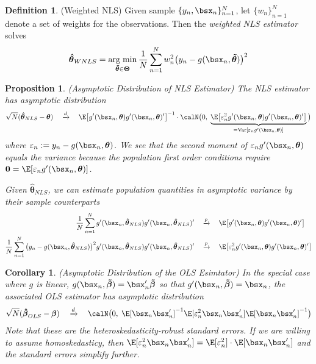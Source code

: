 \documentclass[12pt]{article}
\theoremstyle{plain}
\newtheorem{prop}[thm]{Proposition}
\newtheorem{cor}[thm]{Corollary}
\theoremstyle{definition}
\newtheorem{defn}[thm]{Definition}
\theoremstyle{remark}
\newcommand{\bstheta}{\boldsymbol{\theta}}
\newcommand{\bsTheta}{\boldsymbol{\Theta}}
\newcommand{\bsbeta}{\boldsymbol{\beta}}
\newcommand{\bshatbeta}{\boldsymbol{\hat{\beta}}}
\newcommand{\bshattheta}{\boldsymbol{\hat{\theta}}}
\newcommand{\bstildebeta}{\boldsymbol{\tilde{\beta}}}
\newcommand{\bstildetheta}{\boldsymbol{\tilde{\theta}}}
\renewcommand{\bso}{\boldsymbol{0}}
\DeclareMathOperator*{\argmin}{arg\;min}
\newcommand{\Var}{\operatorname{Var}}
\newcommand{\pto}{\xrightarrow{p}}
\newcommand{\dto}{\xrightarrow{d}}
\newcommand{\sumnN}{\sum^N_{n=1}}
\newcommand{\nN}{_{n=1}^N}
\begin{document}
\begin{defn}(Weighted NLS)
Given sample $\{y_n,\bsx_n\}\nN$, let $\{w_n\}\nN$ denote a set of
weights for the observations. Then the \emph{weighted NLS estimator}
solves
\begin{align}
  \bshattheta_{WNLS}
  = \argmin_{\bstildetheta\in\bsTheta}
  \frac{1}{N}\sumnN w_n^2\big(y_n-g(\bsx_n,\bstildetheta)\big)^2
  \label{wnls}
\end{align}
\end{defn}


\begin{prop}\emph{(Asymptotic Distribution of NLS Estimator)}
The NLS estimator has asymptotic distribution
\begin{align*}
  \sqrt{N}(\bshattheta_{NLS}-\bstheta)
  \quad\dto\quad
  \E\big[
  g'(\bsx_n,\bstheta)g'(\bsx_n,\bstheta)'
  \big]^{-1}
  \cdot
  \calN\big(0,\;
  \underbrace{%
  \E\big[\varepsilon_n^2g'(\bsx_n,\bstheta)g'(\bsx_n,\bstheta)'\big]
  }_{=\Var[\varepsilon_ng'(\bsx_n,\bstheta)]}
  \big)
\end{align*}
where $\varepsilon_n:=y_n-g(\bsx_n,\bstheta)$.  We see that the second
moment of $\varepsilon_n g'(\bsx_n,\bstheta)$ equals the variance
because the population first order conditions require
$\bso = \E[\varepsilon_n g'(\bsx_n,\bstheta)]$.

Given $\bshattheta_{NLS}$, we can estimate population quantities in
asymptotic variance by their sample counterparts
\begin{align*}
  \frac{1}{N}\sumnN
  g'(\bsx_n,\bshattheta_{NLS})g'(\bsx_n,\bshattheta_{NLS})'
  \quad&\pto\quad
  \E\big[
  g'(\bsx_n,\bstheta)g'(\bsx_n,\bstheta)'
  \big]
  \\
  \frac{1}{N}\sumnN
  \big(y_n-g(\bsx_n,\bshattheta_{NLS})\big)^2
  g'(\bsx_n,\bshattheta_{NLS})g'(\bsx_n,\bshattheta_{NLS})'
  \quad&\pto\quad
  \E\big[\varepsilon_n^2
  g'(\bsx_n,\bstheta)g'(\bsx_n,\bstheta)'
  \big]
  \notag
\end{align*}
\end{prop}
\begin{cor}\emph{(Asymptotic Distribution of the OLS Esimtator)}
In the special case where $g$ is linear,
$g(\bsx_n,\bstildebeta)=\bsx_n'\bstildebeta$ so that
$g'(\bsx_n,\bstildebeta)=\bsx_n$, the associated OLS estimator has
asymptotic distribution
\begin{align*}
  \sqrt{N}(\bshatbeta_{OLS}-\bsbeta)
  \quad\dto\quad
  \calN\big(0,\;
  \E[ \bsx_n\bsx_n' ]^{-1}
  \E[\varepsilon_n^2 \bsx_n\bsx_n' ]
  \E[ \bsx_n\bsx_n' ]^{-1}
  \big)
\end{align*}
Note that these are the heteroskedasticity-robust standard errors. If we
are willing to assume homoskedasticy, then
$\E[\varepsilon_n^2\bsx_n\bsx_n']=\E[\varepsilon_n^2]\cdot\E[\bsx_n\bsx_n']$
and the standard errors simplify further.
\end{cor}
\end{document}
